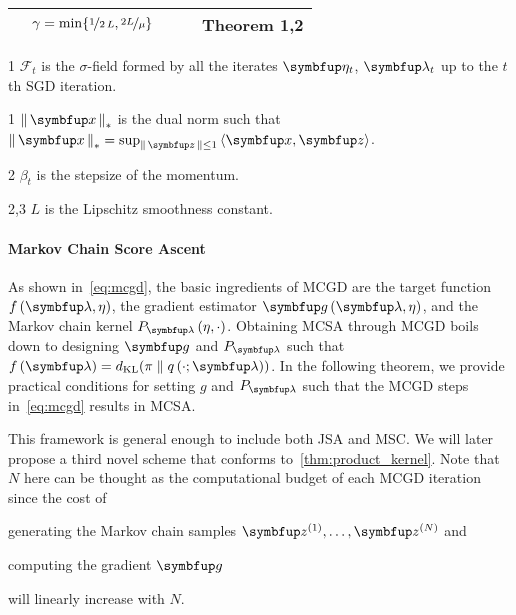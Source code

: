 \begin{table*}
\begin{threeparttable}
\begin{tabular}{lllcc}
    \\ 
    & {\footnotesize\(\gamma = \min\{\nicefrac{1}{2\,L}, \nicefrac{2 L}{\mu}\}\)}
    &&& {\footnotesize{Theorem 1,2}}
    \\ \bottomrule
  \end{tabular}
  \begin{tablenotes}
  \item[1]{ \(\mathcal{F}_t\) is the \(\sigma\)-field formed by all the iterates \(\veta_t\), \(\vlambda_t\) up to the \(t\)th SGD iteration. }
  \item[1]{ \(\norm{\vx}_*\) is the dual norm such that \(\norm{\vx}_* = \sup_{\norm{\vz} \leq 1} \iprod{\vx}{\vz}\).}
  \item[2]{ \(\beta_t\) is the stepsize of the momentum.}
  \item[2,3]{ \(L\) is the Lipschitz smoothness constant.}
  \end{tablenotes}
\end{threeparttable}
\vspace{-0.2in}
\end{table*}


\vspace{-0.05in}
\paragraph{Markov Chain Score Ascent}
As shown in~\cref{eq:mcgd}, the basic ingredients of MCGD are the target function \(f\left(\vlambda, \eta\right)\), the gradient estimator \(\vg\left(\vlambda, \eta\right)\), and the Markov chain kernel \(P_{\vlambda}\left(\eta, \cdot\right)\).
Obtaining MCSA through MCGD boils down to designing \(\vg\) and \(P_{\vlambda}\) such that \(f\left(\vlambda\right) = \DKL{\pi}{q\left(\cdot; \vlambda\right)} \).
In the following theorem, we provide practical conditions for setting \(g\) and \(P_{\vlambda}\) such that the MCGD steps in~\cref{eq:mcgd} results in MCSA.



This framework is general enough to include both JSA and MSC.
We will later propose a third novel scheme that conforms to~\cref{thm:product_kernel}.
Note that \(N\) here can be thought as the computational budget of each MCGD iteration since the cost of
\begin{enumerate*}[label=\textbf{(\roman*)}]
  \item generating the Markov chain samples \(\vz^{(1)}, \ldots, \vz^{(N)}\) and
  \item computing the gradient \(\vg\)
\end{enumerate*}
will linearly increase with \(N\).

